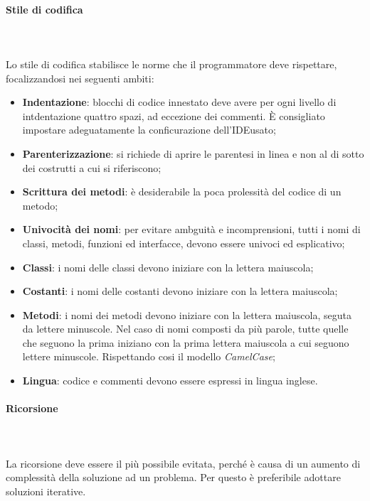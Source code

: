 		\paragraph{Stile di codifica} \mbox{} \\ \mbox{} \\
		Lo stile di codifica stabilisce le norme che il programmatore deve rispettare, focalizzandosi nei seguenti ambiti:
		\begin{itemize}
			\item \textbf{Indentazione}: blocchi di codice innestato deve avere per ogni livello di intdentazione quattro spazi, ad eccezione dei commenti. È consigliato impostare adeguatamente la conficurazione dell'IDE\glo usato;
			\item \textbf{Parenterizzazione}: si richiede di aprire le parentesi in linea e non al di sotto dei costrutti a cui si riferiscono;
			\item \textbf{Scrittura dei metodi}: è desiderabile la poca prolessità del codice di un metodo;
			\item \textbf{Univocità dei nomi}: per evitare ambguità e incomprensioni, tutti i nomi di classi, metodi, funzioni ed interfacce, devono essere univoci ed esplicativo;
			\item \textbf{Classi}: i nomi delle classi devono iniziare con la lettera maiuscola;
			\item \textbf{Costanti}: i nomi delle costanti devono iniziare con la lettera maiuscola;
			\item \textbf{Metodi}: i nomi dei metodi devono iniziare con la lettera maiuscola, seguta da lettere minuscole. Nel caso di nomi composti da più parole, tutte quelle che seguono la prima iniziano con la prima lettera maiuscola a cui seguono lettere minuscole. Rispettando cosi il modello \textit{CamelCase}\glo;
			\item \textbf{Lingua}: codice e commenti devono essere espressi in lingua inglese.
		\end{itemize}
		\paragraph{Ricorsione} \mbox{} \\ \mbox{} \\
		La ricorsione deve essere il più possibile evitata, perché è causa di un aumento di complessità della soluzione ad un problema. Per questo è preferibile adottare soluzioni iterative.
